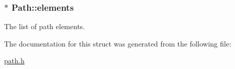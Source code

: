 \subsubsection[{\texorpdfstring{elements}{elements}}]{$\ast$ Path\+::elements}\hypertarget{structPath_a9767e852a01fe98f15198cc23538aad0}{}\label{structPath_a9767e852a01fe98f15198cc23538aad0}
The list of path elements. 

The documentation for this struct was generated from the following file\+:\begin{DoxyCompactItemize}
\item 
\hyperlink{path_8h}{path.\+h}\end{DoxyCompactItemize}
